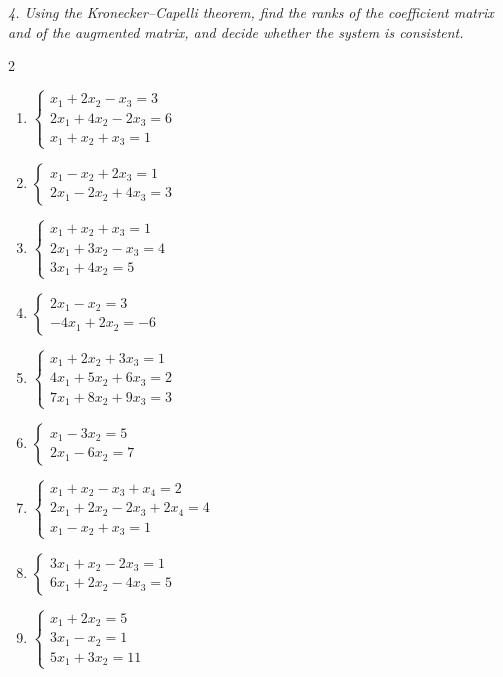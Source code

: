 \emph{4. Using the Kronecker–Capelli theorem, find the ranks of the coefficient matrix and of the augmented matrix, and decide whether the system is consistent.}
\bigskip
\begin{multicols}{2}\raggedright
\small
\begin{enumerate}[label=\arabic*.,  leftmargin=*]
\item $\begin{cases}x_1+2x_2-x_3=3\\2x_1+4x_2-2x_3=6\\x_1+x_2+x_3=1\end{cases}$
\item $\begin{cases}x_1-x_2+2x_3=1\\2x_1-2x_2+4x_3=3\end{cases}$
\item $\begin{cases}x_1+x_2+x_3=1\\2x_1+3x_2-x_3=4\\3x_1+4x_2=5\end{cases}$
\item $\begin{cases}2x_1-x_2=3\\-4x_1+2x_2=-6\end{cases}$
\item $\begin{cases}x_1+2x_2+3x_3=1\\4x_1+5x_2+6x_3=2\\7x_1+8x_2+9x_3=3\end{cases}$
\item $\begin{cases}x_1-3x_2=5\\2x_1-6x_2=7\end{cases}$
\item $\begin{cases}x_1+x_2-x_3+x_4=2\\2x_1+2x_2-2x_3+2x_4=4\\x_1-x_2+x_3=1\end{cases}$
\item $\begin{cases}3x_1+x_2-2x_3=1\\6x_1+2x_2-4x_3=5\end{cases}$
\item $\begin{cases}x_1+2x_2=5\\3x_1-x_2=1\\5x_1+3x_2=11\end{cases}$

\end{enumerate}
\end{multicols}
